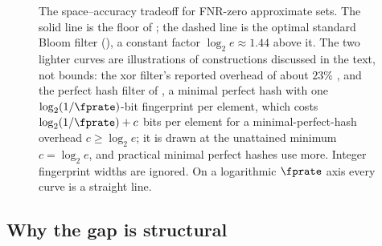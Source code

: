 \begin{figure}[ht]
\centering
{}
\caption[The space--accuracy tradeoff for one-sided approximate sets]{The space--accuracy tradeoff for
FNR-zero approximate sets. The solid line is the floor of
; the dashed line is the optimal standard Bloom filter
(), a constant factor $\log_2 e \approx 1.44$ above
it. The two lighter curves are illustrations of constructions discussed in
the text, not bounds: the xor filter's reported overhead of about $23\%$
\parencite{graf-lemire-2020,graf-lemire-2022}, and the perfect hash filter
of , a minimal perfect hash with one $\log_2(1/\fprate)$-bit
fingerprint per element, which costs $\log_2(1/\fprate) + c$ bits per element
for a minimal-perfect-hash overhead $c \ge \log_2 e$; it is drawn at the
unattained minimum $c = \log_2 e$, and practical minimal perfect hashes use
more. Integer fingerprint widths are ignored.
On a logarithmic $\fprate$ axis every curve is a straight line.}
\label{fig:space-accuracy}
\end{figure}

\subsection*{Why the gap is structural}

